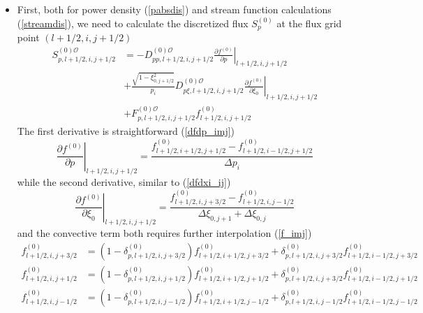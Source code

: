 \begin{itemize}
\item  First, both for power density (\ref{pabsdis}) and stream function
calculations (\ref{streamdis}), we need to calculate the discretized flux
$S_{p}^{(0)}$ at the flux grid point $\left(  l+1/2,i,j+1/2\right)  $%
\begin{align}
S_{p,l+1/2,i,j+1/2}^{\left(  0\right)  \mathcal{O}} &  =-D_{pp,l+1/2,i,j+1/2}%
^{(0)\mathcal{O}}\left.  \frac{\partial f^{(0)}}{\partial p}\right|
_{l+1/2,i,j+1/2}\\
&  +\frac{\sqrt{1-\xi_{0,j+1/2}^{2}}}{p_{i}}D_{p\xi,l+1/2,i,j+1/2}%
^{(0)\mathcal{O}}\left.  \frac{\partial f^{(0)}}{\partial\xi_{0}}\right|
_{l+1/2,i,j+1/2}\nonumber\\
&  +F_{p,l+1/2,i,j+1/2}^{(0)\mathcal{O}}f_{l+1/2,i,j+1/2}^{(0)}\nonumber
\end{align}
The first derivative is straightforward (\ref{dfdp_imj})
\begin{equation}
\left.  \frac{\partial f^{\left(  0\right)  }}{\partial p}\right|
_{l+1/2,i,j+1/2}=\frac{f_{l+1/2,i+1/2,j+1/2}^{\left(  0\right)  }%
-f_{l+1/2,i-1/2,j+1/2}^{\left(  0\right)  }}{\Delta p_{i}}%
\end{equation}
while the second derivative, similar to (\ref{dfdxi_ij})
\begin{equation}
\left.  \frac{\partial f^{(0)}}{\partial\xi_{0}}\right|  _{l+1/2,i,j+1/2}%
=\frac{f_{l+1/2,i,j+3/2}^{\left(  0\right)  }-f_{l+1/2,i,j-1/2}^{\left(
0\right)  }}{\Delta\xi_{0,j+1}+\Delta\xi_{0,j}}%
\end{equation}
and the convective term both requires further interpolation (\ref{f_imj})
\begin{align}
f_{l+1/2,i,j+3/2}^{\left(  0\right)  } &  =\left(  1-\delta_{p,l+1/2,i,j+3/2}%
^{\left(  0\right)  }\right)  f_{l+1/2,i+1/2,j+3/2}^{\left(  0\right)
}+\delta_{p,l+1/2,i,j+3/2}^{\left(  0\right)  }f_{l+1/2,i-1/2,j+3/2}^{\left(
0\right)  }\\
f_{l+1/2,i,j+1/2}^{\left(  0\right)  } &  =\left(  1-\delta_{p,l+1/2,i,j+1/2}%
^{\left(  0\right)  }\right)  f_{l+1/2,i+1/2,j+1/2}^{\left(  0\right)
}+\delta_{p,l+1/2,i,j+3/2}^{\left(  0\right)  }f_{l+1/2,i-1/2,j+1/2}^{\left(
0\right)  }\\
f_{l+1/2,i,j-1/2}^{\left(  0\right)  } &  =\left(  1-\delta_{p,l+1/2,i,j-1/2}%
^{\left(  0\right)  }\right)  f_{l+1/2,i+1/2,j-1/2}^{\left(  0\right)
}+\delta_{p,l+1/2,i,j-1/2}^{\left(  0\right)  }f_{l+1/2,i-1/2,j-1/2}^{\left(
0\right)  }%
\end{align}

\end{itemize}
